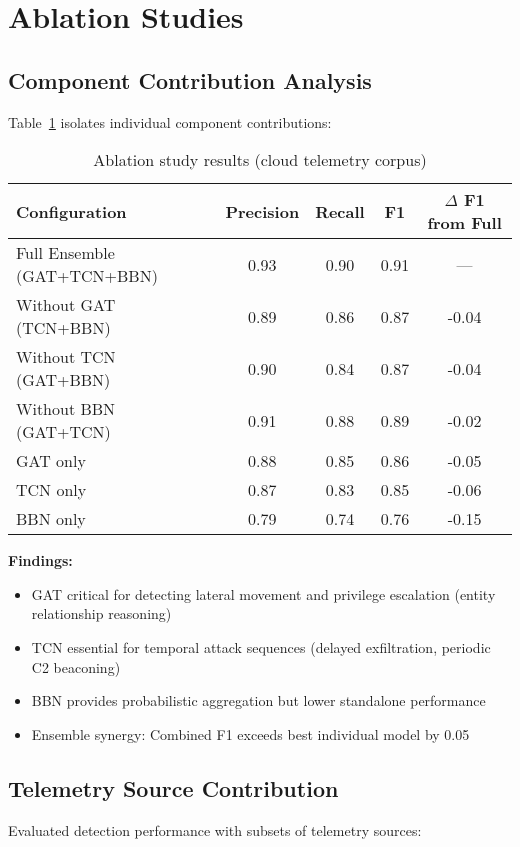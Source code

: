 \section{Ablation Studies}\label{sec:eval-ablation}
\subsection{Component Contribution Analysis}
Table~\ref{tab:ablation} isolates individual component contributions:

\begin{table}[H]
\centering
\caption{Ablation study results (cloud telemetry corpus)}
\label{tab:ablation}
\begin{tabular}{lcccc}
\toprule
\textbf{Configuration} & \textbf{Precision} & \textbf{Recall} & \textbf{F1} & \textbf{$\Delta$ F1 from Full} \\
\midrule
Full Ensemble (GAT+TCN+BBN) & 0.93 & 0.90 & 0.91 & --- \\
Without GAT (TCN+BBN) & 0.89 & 0.86 & 0.87 & -0.04 \\
Without TCN (GAT+BBN) & 0.90 & 0.84 & 0.87 & -0.04 \\
Without BBN (GAT+TCN) & 0.91 & 0.88 & 0.89 & -0.02 \\
GAT only & 0.88 & 0.85 & 0.86 & -0.05 \\
TCN only & 0.87 & 0.83 & 0.85 & -0.06 \\
BBN only & 0.79 & 0.74 & 0.76 & -0.15 \\
\bottomrule
\end{tabular}
\end{table}

\textbf{Findings:}
\begin{itemize}
    \item GAT critical for detecting lateral movement and privilege escalation (entity relationship reasoning)
    \item TCN essential for temporal attack sequences (delayed exfiltration, periodic C2 beaconing)
    \item BBN provides probabilistic aggregation but lower standalone performance
    \item Ensemble synergy: Combined F1 exceeds best individual model by 0.05
\end{itemize}

\subsection{Telemetry Source Contribution}
Evaluated detection performance with subsets of telemetry sources:

